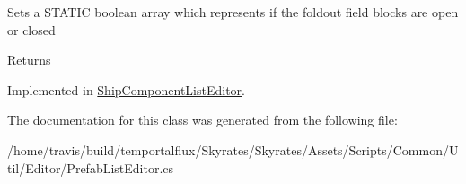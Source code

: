 Sets a S\-T\-A\-T\-I\-C boolean array which represents if the foldout field blocks are open or closed 

\begin{DoxyReturn}{Returns}

\end{DoxyReturn}


Implemented in \hyperlink{class_ship_component_list_editor_a32bf47a4ec5ee1b5769a986bcaf6cf06}{Ship\-Component\-List\-Editor}.



The documentation for this class was generated from the following file\-:\begin{DoxyCompactItemize}
\item 
/home/travis/build/temportalflux/\-Skyrates/\-Skyrates/\-Assets/\-Scripts/\-Common/\-Util/\-Editor/Prefab\-List\-Editor.\-cs\end{DoxyCompactItemize}
